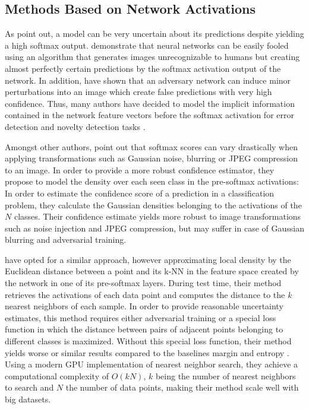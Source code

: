 \documentclass[10pt]{article}
\begin{document}
\subsection{Methods Based on Network Activations}
\label{subsec:pre-softmax}
As \textcite{ghahramani} point out, a model can be very uncertain about its predictions despite yielding a high softmax output. \textcite{NguyenYC14} demonstrate that neural networks can be easily fooled using an algorithm that generates images unrecognizable to humans but creating almost perfectly certain predictions by the softmax activation output of the network. In addition, \textcite{Goodfellow2014} have shown that an adversary network can induce minor perturbations into an image which create false predictions with very high confidence. Thus, many authors have decided to model the implicit information contained in the network feature vectors before the softmax activation for error detection and novelty detection tasks \cite{subramanya, mandelbaum17, Bishop1994NoveltyDA}.

Amongst other authors, \textcite{subramanya} point out that softmax scores can vary drastically when applying transformations such as Gaussian noise, blurring or JPEG compression to an image. In order to provide a more robust confidence estimator, they propose to model the density over each seen class in the pre-softmax activations: In order to estimate the confidence score of a prediction in a classification problem, they calculate the Gaussian densities belonging to the activations of the $N$ classes. Their confidence estimate yields more robust to image transformations such as noise injection and JPEG compression, but may suffer in case of Gaussian blurring and adversarial training.

\textcite{mandelbaum17} have opted for a similar approach, however approximating local density by the Euclidean distance between a point and its \gls{k-NN} in the feature space created by the network in one of its pre-softmax layers. During test time, their method retrieves the activations of each data point and computes the distance to the \textit{k} nearest neighbors of each sample. In order to provide reasonable uncertainty estimates, this method requires either adversarial training or a special loss function in which the distance between pairs of adjacent points belonging to different classes is maximized. Without this special loss function, their method yields worse or similar results compared to the baselines margin and entropy \cite{mandelbaum17}. Using a modern \acrshort{GPU} implementation of nearest neighbor search, they achieve a computational complexity of $O(kN)$, $k$ being the number of nearest neighbors to search and $N$ the number of data points, making their method scale well with big datasets.
\end{document}
